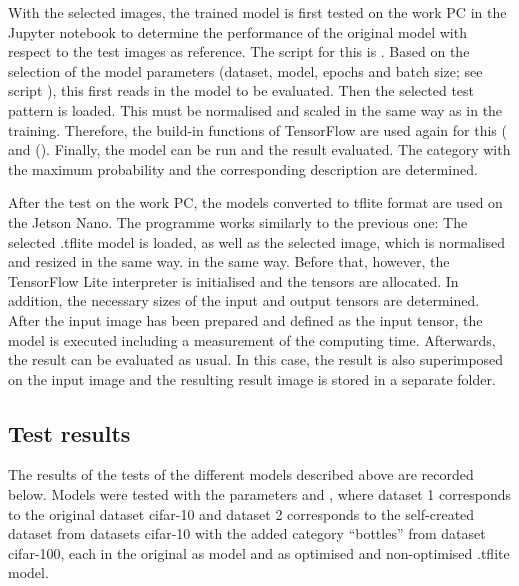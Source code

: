 With the selected images, the trained model is first tested on the work PC in the Jupyter notebook to determine the performance of the original model with respect to the test images as reference. The script for this is . Based on the selection of the model parameters (dataset, model, epochs and batch size; see script ), this first reads in the model to be evaluated. Then the selected test pattern is loaded. This must be normalised and scaled in the same way as in the training. Therefore, the build-in functions of TensorFlow are used again for this ( and ().
Finally, the model can be run and the result evaluated. The category with the maximum probability and the corresponding description are determined.

\begin{code}
  
  \caption{Classification of the test patterns}
\end{code}  

After the test on the work PC, the models converted to tflite format are used on the Jetson Nano. The programme  works similarly to the previous one:
The selected .tflite model is loaded, as well as the selected image, which is normalised and resized in the same way.
in the same way. Before that, however, the TensorFlow Lite interpreter is initialised and the tensors are allocated. In addition, the necessary sizes of the input and output tensors are determined. After the input image has been prepared and defined as the input tensor, the model is executed including a measurement of the computing time. Afterwards, the result can be evaluated as usual. In this case, the result is also superimposed on the input image and the resulting result image is stored in a separate folder.

\begin{code}
  
  \caption{Determination of the calculation time}
\end{code}  


\subsection{Test results}

The results of the tests of the different models described above are recorded below. Models were tested with the parameters and , where dataset 1 corresponds to the original dataset \ac{cifar}-10 and dataset 2 corresponds to the self-created dataset from datasets \ac{cifar}-10 with the added category ``bottles'' from dataset \ac{cifar}-100, each in the original as model  and as optimised and non-optimised .tflite model.

